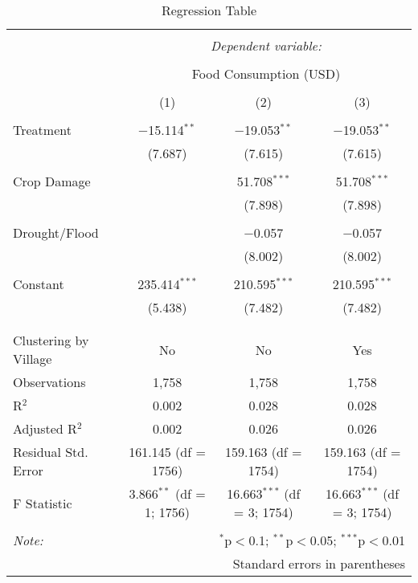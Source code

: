 
\begin{table}[!htbp] \centering 
  \caption{Regression Table} 
  \label{} 
\begin{tabular}{@{\extracolsep{5pt}}lccc} 
\\[-1.8ex]\hline 
\hline \\[-1.8ex] 
 & \multicolumn{3}{c}{\textit{Dependent variable:}} \\ 
\cline{2-4} 
\\[-1.8ex] & \multicolumn{3}{c}{Food Consumption (USD)} \\ 
\\[-1.8ex] & (1) & (2) & (3)\\ 
\hline \\[-1.8ex] 
 Treatment & $-$15.114$^{**}$ & $-$19.053$^{**}$ & $-$19.053$^{**}$ \\ 
  & (7.687) & (7.615) & (7.615) \\ 
  & & & \\ 
 Crop Damage &  & 51.708$^{***}$ & 51.708$^{***}$ \\ 
  &  & (7.898) & (7.898) \\ 
  & & & \\ 
 Drought/Flood &  & $-$0.057 & $-$0.057 \\ 
  &  & (8.002) & (8.002) \\ 
  & & & \\ 
 Constant & 235.414$^{***}$ & 210.595$^{***}$ & 210.595$^{***}$ \\ 
  & (5.438) & (7.482) & (7.482) \\ 
  & & & \\ 
\hline \\[-1.8ex] 
Clustering by Village & No & No & Yes \\ 
Observations & 1,758 & 1,758 & 1,758 \\ 
R$^{2}$ & 0.002 & 0.028 & 0.028 \\ 
Adjusted R$^{2}$ & 0.002 & 0.026 & 0.026 \\ 
Residual Std. Error & 161.145 (df = 1756) & 159.163 (df = 1754) & 159.163 (df = 1754) \\ 
F Statistic & 3.866$^{**}$ (df = 1; 1756) & 16.663$^{***}$ (df = 3; 1754) & 16.663$^{***}$ (df = 3; 1754) \\ 
\hline 
\hline \\[-1.8ex] 
\textit{Note:}  & \multicolumn{3}{r}{$^{*}$p$<$0.1; $^{**}$p$<$0.05; $^{***}$p$<$0.01} \\ 
 & \multicolumn{3}{r}{Standard errors in parentheses} \\ 
\end{tabular} 
\end{table} 
